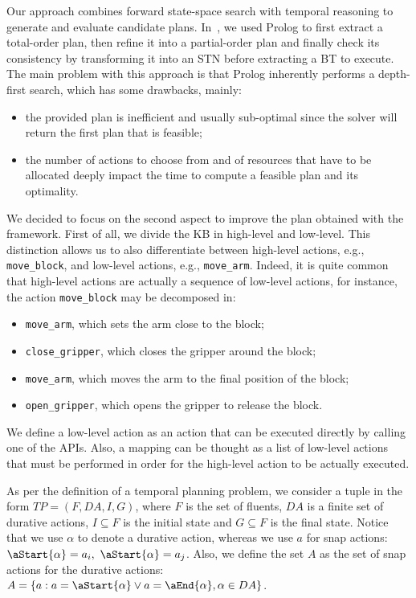 Our approach combines forward state-space search with temporal reasoning to generate and evaluate candidate plans. In~\cite{saccon2023prolog}, we used Prolog to first extract a total-order plan, then refine it into a partial-order plan and finally check its consistency by transforming it into an STN before extracting a BT to execute. 
%
The main problem with this approach is that Prolog inherently performs a depth-first search, which has some drawbacks, mainly:
\begin{itemize}
    \item the provided plan is inefficient and usually sub-optimal since the solver will return the first plan that is feasible;
    \item the number of actions to choose from and of resources that have to be allocated deeply impact the time to compute a feasible plan and its optimality.
\end{itemize}
We decided to focus on the second aspect to improve the plan obtained with the framework. 
%
First of all, we divide the KB in high-level and low-level. This distinction allows us to also differentiate between high-level actions, e.g., \texttt{move\_block}, and low-level actions, e.g., \texttt{move\_arm}. Indeed, it is quite common that high-level actions are actually a sequence of low-level actions, for instance, the action \texttt{move\_block} may be decomposed in:
\begin{itemize}
    \item \texttt{move\_arm}, which sets the arm close to the block;
    \item \texttt{close\_gripper}, which closes the gripper around the block;
    \item \texttt{move\_arm}, which moves the arm to the final position of the block;
    \item \texttt{open\_gripper}, which opens the gripper to release the block.
\end{itemize}
We define a low-level action as an action that can be executed directly by calling one of the APIs. Also, a mapping can be thought as a list of low-level actions that must be performed in order for the high-level action to be actually executed.


As per the definition of a temporal planning problem, we consider a tuple in the form $TP=(F, DA, I, G)$, where $F$ is the set of fluents, $DA$ is a finite set of durative actions, $I\subseteq F$ is the initial state and $G\subseteq F$ is the final state. Notice that we use $\alpha$ to denote a durative action, whereas we use $a$ for snap actions: $\aStart{\alpha}=a_i,~\aStart{\alpha}=a_j$. Also, we define the set $A$ as the set of snap actions for the durative actions: $A=\{a : a=\aStart{\alpha}\vee a=\aEnd{\alpha}, \alpha\in DA\}$.

